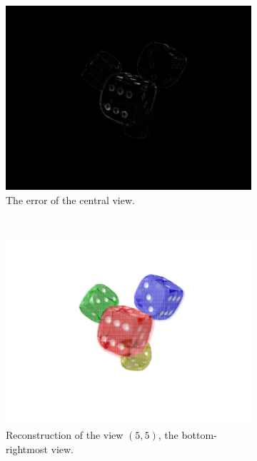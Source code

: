 \documentclass[11pt,a4paper,titlepage]{article}
\begin{document}
\begin{figure}[h]
\begin{subfigure}[t]{0.4\textwidth}
		\includegraphics[width=\textwidth]{results/dice_perspective_rec_3Layers_r=1/central_view_error.png}
		\caption{The error of the central view.}
	\end{subfigure}%
	\\
	\begin{subfigure}[t]{0.4\textwidth}
		\includegraphics[width=\textwidth]{results/dice_perspective_rec_3Layers_r=1/custom_view_reconstruction.png}
		\caption{Reconstruction of the view $\left( 5, 5 \right)$, the bottom-rightmost view.}
	\end{subfigure}%
	~
	\begin{subfigure}[t]{0.4\textwidth}

\end{subfigure}
\end{figure}
\end{document}
